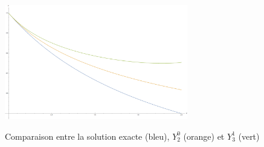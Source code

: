 \documentclass{beamer}
\begin{document}
\begin{frame}
\begin{figure}
\caption{Comparaison entre la solution exacte (bleu), $Y^0_2$ (orange) et $Y^1_3$ (vert)}
\includegraphics[width = 80mm]{CourbesPhys3.png}
\label{solb}
\end{figure}
\end{frame}
\end{document}
